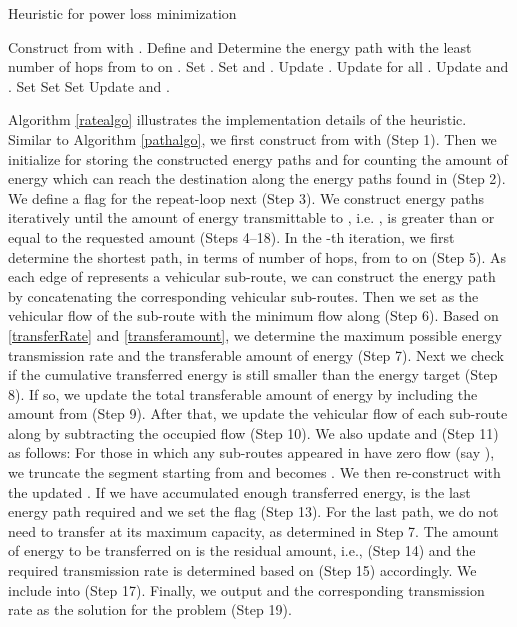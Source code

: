 \documentclass[journal]{IEEEtran}
\begin{document}
\begin{algorithm}
\caption{Heuristic for power loss minimization} \label{ratealgo}
\begin{algorithmic}[1]
\STATE Construct  from  with .
\STATE Define  and 
\STATE 
\REPEAT
	\STATE Determine the energy path  with the least number of hops from  to  on .
	\STATE Set .
	\STATE Set  and .
	\IF {}
		\STATE Update .
		\STATE Update  for all .
		\STATE Update  and .
	\ELSE
		\STATE Set 
		\STATE Set 
		\STATE Set 
	\ENDIF
	\STATE Update 
\UNTIL {}
\RETURN  and .
\end{algorithmic}
\end{algorithm}

Algorithm \ref{ratealgo} illustrates the implementation details of the heuristic. Similar to Algorithm \ref{pathalgo}, we first construct 
 from  with  (Step 1). Then we initialize  for storing the constructed energy paths and  for counting the amount of energy which can reach the destination  along the energy paths found in  (Step 2). We define a flag  for the repeat-loop next (Step 3). We construct energy paths iteratively until the amount of energy transmittable to , i.e. , is greater than or equal to the requested amount  (Steps 4--18). In the -th iteration, we first determine the shortest path, in terms of number of hops, from  to  on  (Step 5). As each edge of  represents a vehicular sub-route, we can construct the energy path  by concatenating the corresponding vehicular sub-routes.  Then we set  as the vehicular flow  of the sub-route with the minimum flow along  (Step 6). Based on \eqref{transferRate} and \eqref{transferamount}, we determine the maximum possible energy transmission rate  and the transferable amount of energy  (Step 7). 
Next we check if the cumulative transferred energy is still smaller than the energy target  (Step 8). If so, we update the total transferable amount of energy by including the amount  from  (Step 9). After that, we update the vehicular flow  of each sub-route  along  by subtracting the occupied flow  (Step 10). We also update  and  (Step 11) as follows: For those  in which any sub-routes appeared in  have zero flow (say ), we truncate the segment starting from  and  becomes . We then re-construct  with the updated . 
If we have accumulated enough transferred energy,  is the last energy path required and we set the flag  (Step 13). For the last path, we do not need to transfer at its maximum capacity, as determined in Step 7. The amount of energy  to be transferred on  is the residual amount, i.e.,  (Step 14) and the required transmission rate is determined based on  (Step 15) accordingly.
We include  into  (Step 17). Finally, we output  and the corresponding transmission rate  as the solution for the problem (Step 19).
\end{document}

